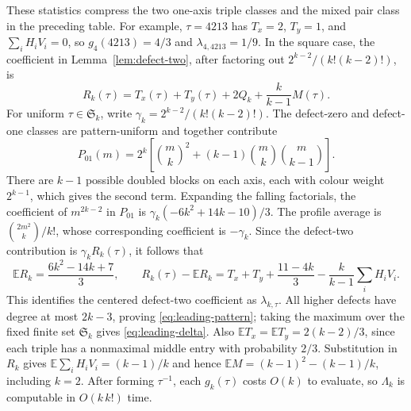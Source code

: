 \documentclass[11pt,letterpaper]{article}
\newcommand{\Ssym}{\mathfrak S}
\begin{document}
These statistics compress the two one-axis triple classes and the mixed
pair class in the preceding table.  For example, $\tau=4213$ has
$T_x=2$, $T_y=1$, and $\sum_iH_iV_i=0$, so
$g_4(4213)=4/3$ and $\lambda_{4,4213}=1/9$.
In the square case, the coefficient in Lemma~\ref{lem:defect-two}, after
factoring out $2^{k-2}/(k!(k-2)!)$, is
\[
 R_k(\tau)=T_x(\tau)+T_y(\tau)+2Q_k+
             \frac{k}{k-1}M(\tau).
\]
For uniform $\tau\in\Ssym_k$, write $\gamma_k=2^{k-2}/(k!(k-2)!)$. The defect-zero and defect-one
classes are pattern-uniform and together contribute
\[
 P_{01}(m)=2^k\left[\binom mk^2+(k-1)\binom mk\binom m{k-1}\right].
\]
There are $k-1$ possible doubled blocks on each axis, each with colour
weight $2^{k-1}$, which gives the second term. Expanding the falling
factorials, the coefficient of $m^{2k-2}$ in $P_{01}$ is
$\gamma_k(-6k^2+14k-10)/3$. The profile average is
$\binom{2m^2}{k}/k!$, whose corresponding coefficient is $-\gamma_k$.
Since the defect-two contribution is $\gamma_kR_k(\tau)$, it follows that
\[
 \mathbb ER_k=\frac{6k^2-14k+7}{3},\qquad
 R_k(\tau)-\mathbb ER_k
 =T_x+T_y+\frac{11-4k}{3}-\frac{k}{k-1}\sum_iH_iV_i.
\]
This identifies the centered defect-two coefficient as $\lambda_{k,\tau}$.
All higher defects have degree at most $2k-3$, proving
\eqref{eq:leading-pattern}; taking the maximum over the fixed finite set
$\Ssym_k$ gives \eqref{eq:leading-delta}. Also
$\mathbb ET_x=\mathbb ET_y=2(k-2)/3$, since each triple has a nonmaximal
middle entry with probability $2/3$. Substitution in $R_k$ gives
$\mathbb E\sum_iH_iV_i=(k-1)/k$ and hence
$\mathbb EM=(k-1)^2-(k-1)/k$, including $k=2$.
After forming
$\tau^{-1}$, each $g_k(\tau)$ costs $O(k)$ to evaluate, so
$\Lambda_k$ is computable in $O(k\,k!)$ time.
\end{document}
